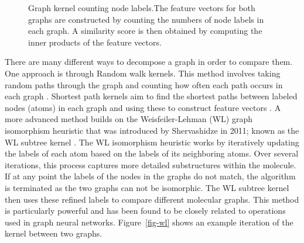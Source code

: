 \documentclass[
  super,
  preprint,
  3p]{elsarticle}
\begin{document}
\begin{figure}


\caption{\label{fig-count}Graph kernel counting node labels.The feature
vectors for both graphs are constructed by counting the numbers of node
labels in each graph. A similarity score is then obtained by computing
the inner products of the feature vectors.}

\end{figure}%

There are many different ways to decompose a graph in order to compare
them. One approach is through Random walk kernels. This method involves
taking random paths through the graph and counting how often each path
occurs in each graph \citep{gartner_survey_2003}. Shortest path kernels
aim to find the shortest paths between labeled nodes (atoms) in each
graph and using these to construct feature vectors \citep{RN30}. A more
advanced method builds on the Weisfeiler-Lehman (WL) graph isomorphism
heuristic that was introduced by Shervashidze in 2011; known as the WL
subtree kernel \citep{RN46}. The WL isomorphism heuristic works by
iteratively updating the labels of each atom based on the labels of its
neighboring atoms. Over several iterations, this process captures more
detailed substructures within the molecule. If at any point the labels
of the nodes in the graphs do not match, the algorithm is terminated as
the two graphs can not be isomorphic. The WL subtree kernel then uses
these refined labels to compare different molecular graphs. This method
is particularly powerful and has been found to be closely related to
operations used in graph neural networks. Figure~\ref{fig-wl} shows an
example iteration of the kernel between two graphs.
\end{document}
